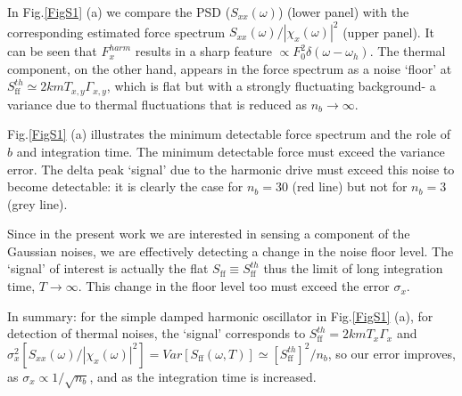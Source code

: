 \documentclass[twocolumn,english,notitlepage,superscriptaddress,nofootinbib]{revtex4-2}
\begin{document}
  In Fig.\ref{FigS1} (a) we  compare the PSD ($S_{xx}(\omega)$) (lower panel) with the corresponding estimated force spectrum $ S_{xx}(\omega)/|\chi_x(\omega)|^2$ (upper panel).  It can be seen that $F_x^{harm}$  results in a sharp feature $\propto F^2_0 \delta(\omega-\omega_h)$.   The thermal component, on the other hand,  appears in the force spectrum as a  noise `floor' at $S^{th}_{\text{ff}} \simeq 2k m T_{x,y} \Gamma_{x,y}$,   which is  flat but with a strongly fluctuating background- a variance due to thermal fluctuations that is reduced as $n_b\to \infty$.

 
Fig.\ref{FigS1} (a)  illustrates  the minimum detectable force  spectrum and the role of $b$ and integration time.
 The minimum detectable force must exceed the variance error.  The delta peak `signal' due to the harmonic drive must exceed this noise to become detectable: it is clearly the case for $n_b=30$ (red line) but not for $n_b=3$ (grey line).

Since in the present work we  are interested in sensing a component of the Gaussian noises, we are effectively detecting a change in the noise floor level.   The `signal' of interest  is actually the flat  $S_{\text{ff}}\equiv S^{th}_{\text{ff}}$    thus the limit of long integration time, $T \to \infty $.  This change in the floor level too must exceed the error $\sigma_x$.

In summary: for the simple  damped harmonic oscillator in Fig.\ref{FigS1} (a),  for detection of thermal noises, the `signal' corresponds to  $ S^{th}_{\text{ff}}= 2k m T_x \Gamma_x$ and  $\sigma^2_x[S_{xx}(\omega)/|\chi_x(\omega)|^2] = Var[S_{\text{ff}}(\omega,T)] \simeq   [S^{th}_{\text{ff}}]^2/n_b$,  so our  error improves, as  $\sigma_x \propto  1/\sqrt{n_b}$,  and as the integration time is increased.  
\end{document}
